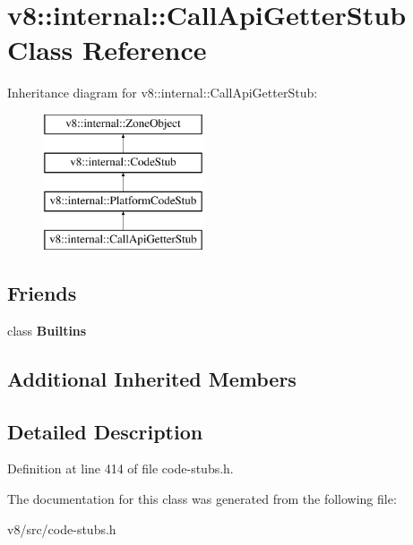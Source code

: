 \hypertarget{classv8_1_1internal_1_1CallApiGetterStub}{}\section{v8\+:\+:internal\+:\+:Call\+Api\+Getter\+Stub Class Reference}
\label{classv8_1_1internal_1_1CallApiGetterStub}
Inheritance diagram for v8\+:\+:internal\+:\+:Call\+Api\+Getter\+Stub\+:\begin{figure}[H]
\begin{center}
\leavevmode
\includegraphics[height=4.000000cm]{classv8_1_1internal_1_1CallApiGetterStub}
\end{center}
\end{figure}
\subsection*{Friends}
\begin{DoxyCompactItemize}
\item 
\mbox{\label{classv8_1_1internal_1_1CallApiGetterStub_afb9273054bbf7171a46b35cebb4d4b34}} 
class {\bfseries Builtins}
\end{DoxyCompactItemize}
\subsection*{Additional Inherited Members}


\subsection{Detailed Description}


Definition at line 414 of file code-\/stubs.\+h.



The documentation for this class was generated from the following file\+:\begin{DoxyCompactItemize}
\item 
v8/src/code-\/stubs.\+h\end{DoxyCompactItemize}

